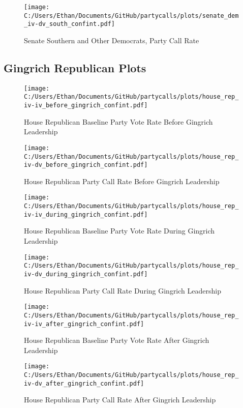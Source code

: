 \documentclass[12pt]{article}
\begin{document}
\begin{figure}[H]
	\centering
	\caption{Senate Southern and Other Democrats, Party Call Rate}
	\texttt{[image: C:/Users/Ethan/Documents/GitHub/partycalls/plots/senate\_dem\_iv-dv\_south\_confint.pdf]}
\end{figure}

\subsection{Gingrich Republican Plots}

\begin{figure}[H]
	\centering
	\caption{House Republican Baseline Party Vote Rate Before Gingrich Leadership}
	\texttt{[image: C:/Users/Ethan/Documents/GitHub/partycalls/plots/house\_rep\_iv-iv\_before\_gingrich\_confint.pdf]}
\end{figure}

\begin{figure}[H]
	\centering
	\caption{House Republican Party Call Rate Before Gingrich Leadership}
	\texttt{[image: C:/Users/Ethan/Documents/GitHub/partycalls/plots/house\_rep\_iv-dv\_before\_gingrich\_confint.pdf]}
\end{figure}

\begin{figure}[H]
	\centering
	\caption{House Republican Baseline Party Vote Rate During Gingrich Leadership}
	\texttt{[image: C:/Users/Ethan/Documents/GitHub/partycalls/plots/house\_rep\_iv-iv\_during\_gingrich\_confint.pdf]}
\end{figure}

\begin{figure}[H]
	\centering
	\caption{House Republican Party Call Rate During Gingrich Leadership}
	\texttt{[image: C:/Users/Ethan/Documents/GitHub/partycalls/plots/house\_rep\_iv-dv\_during\_gingrich\_confint.pdf]}
\end{figure}

\begin{figure}[H]
	\centering
	\caption{House Republican Baseline Party Vote Rate After Gingrich Leadership}
	\texttt{[image: C:/Users/Ethan/Documents/GitHub/partycalls/plots/house\_rep\_iv-iv\_after\_gingrich\_confint.pdf]}
\end{figure}

\begin{figure}[H]
	\centering
	\caption{House Republican Party Call Rate After Gingrich Leadership}
	\texttt{[image: C:/Users/Ethan/Documents/GitHub/partycalls/plots/house\_rep\_iv-dv\_after\_gingrich\_confint.pdf]}
\end{figure}
\end{document}
